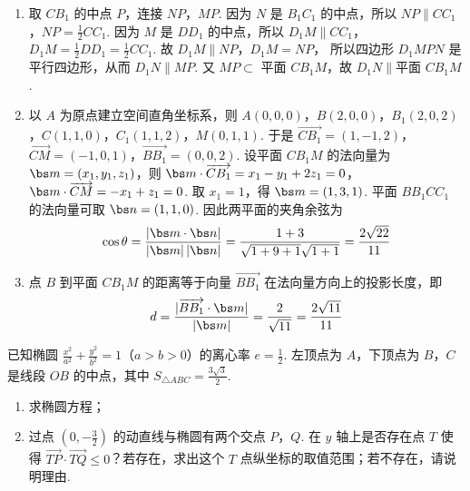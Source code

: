 \begin{solution}
\begin{enumerate}
    \item 取 \(CB_1\) 的中点 \(P\)，连接 \(NP\)，\(MP\). 因为 \(N\) 是 \(B_1C_1\) 的中点，所以
\(NP\parallel CC_1\)，\(NP=\frac12CC_1\).
因为 \(M\) 是 \(DD_1\) 的中点，所以
\(D_1M\parallel CC_1\)，\(D_1M=\frac12DD_1=\frac12CC_1\).
故
\(D_1M\parallel NP\)，\(D_1M=NP\)，
所以四边形 \(D_1MPN\) 是平行四边形，从而
\(D_1N\parallel MP\).
又 \(MP\subset\) 平面 \(CB_1M\)，故
\(D_1N\parallel \text{平面 }CB_1M\).

    \item 以 \(A\) 为原点建立空间直角坐标系，则
\(A(0,0,0)\)，\(B(2,0,0)\)，\(B_1(2,0,2)\)，\(C(1,1,0)\)，\(C_1(1,1,2)\)，\(M(0,1,1)\).
于是
\(\overrightarrow{CB_1}=(1,-1,2)\)，\(\overrightarrow{CM}=(-1,0,1)\)，\(\overrightarrow{BB_1}=(0,0,2)\).
设平面 \(CB_1M\) 的法向量为 \(\bs m=(x_1,y_1,z_1)\)，则
\(\bs m\cdot \overrightarrow{CB_1}=x_1-y_1+2z_1=0\)，\(\bs m\cdot \overrightarrow{CM}=-x_1+z_1=0\).
取 \(x_1=1\)，得
\(\bs m=(1,3,1)\).
平面 \(BB_1CC_1\) 的法向量可取
\(\bs n=(1,1,0)\).
因此两平面的夹角余弦为
\[
\cos\theta=\frac{|\bs m\cdot \bs n|}{|\bs m|\,|\bs n|} =\frac{1+3}{\sqrt{1+9+1}\sqrt{1+1}} =\frac{2\sqrt{22}}{11}
\]

    \item 点 \(B\) 到平面 \(CB_1M\) 的距离等于向量 \(\overrightarrow{BB_1}\) 在法向量方向上的投影长度，即
\[
d=\frac{|\overrightarrow{BB_1}\cdot \bs m|}{|\bs m|} =\frac{2}{\sqrt{11}} =\frac{2\sqrt{11}}{11}
\]
\end{enumerate}
\end{solution}

\begin{problem}
已知椭圆 \(\frac{x^2}{a^2}+\frac{y^2}{b^2}=1\)（\(a>b>0\)）的离心率 \(e=\frac12\). 左顶点为 \(A\)，下顶点为 \(B\)，\(C\) 是线段 \(OB\) 的中点，其中 \(S_{\triangle ABC}=\frac{3\sqrt3}{2}\).
\begin{enumerate}
    \item 求椭圆方程；
    \item 过点 \(\left(0,-\frac32\right)\) 的动直线与椭圆有两个交点 \(P\)，\(Q\). 在 \(y\) 轴上是否存在点 \(T\) 使得 \(\overrightarrow{TP}\cdot \overrightarrow{TQ}\le 0\)？若存在，求出这个 \(T\) 点纵坐标的取值范围；若不存在，请说明理由.
\end{enumerate}
\end{problem}

